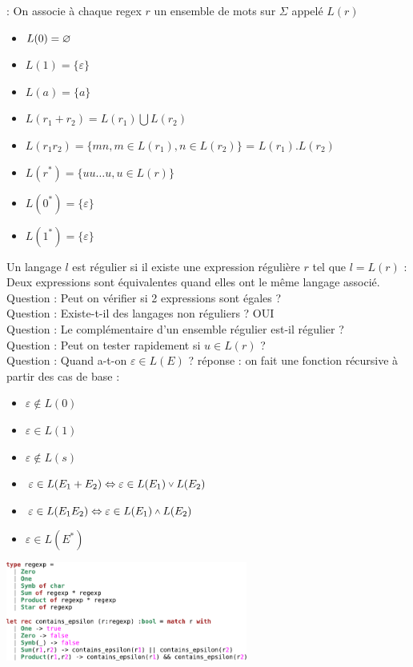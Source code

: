  : On associe à chaque regex $r$ un ensemble de mots sur $\Sigma$ appelé $L(r)$

\begin{itemize}
	\item $L(0) = \varnothing$
	\item $L(1) = \{ \varepsilon \}$
	\item $L(a) = \{ a \}$
	\item $L(r_1 + r_2) = L(r_1)\bigcup L(r_2)$
	\item $L(r_1r_2) = \{ mn, m \in L(r_1), n \in L(r_2) \}$ = $L(r_1) . L(r_2)$
	\item $L(r^*) = \{ uu \ldots u, u \in L(r) \}$
	\item $L(0^*) = \{ \varepsilon \}$
	\item $L(1^*) = \{ \varepsilon \}$
\end{itemize}

 Un langage $l$ est régulier si il existe une expression régulière $r$ tel que $l=L(r)$
 : Deux expressions sont équivalentes quand elles ont le même langage associé. \\
Question : Peut on vérifier si 2 expressions sont égales ? \\
Question : Existe-t-il des langages non réguliers ? OUI \\
Question : Le complémentaire d'un ensemble régulier est-il régulier ? \\
Question : Peut on tester rapidement si $u\in L(r)$ ? \\
Question : Quand a-t-on $\varepsilon \in L(E)$ ? réponse : on fait une fonction récursive à partir des cas de base : 
\begin{itemize}
	\item $\varepsilon \not\in L(0)$\\
	\item $\varepsilon \in L(1)$\\
	\item $\varepsilon \not\in L(s)$\\
	\item $\varepsilon \in L(E_1 + E_2) \Leftrightarrow \varepsilon \in L(E_1) \: \substack{\vee} \: L(E_2)$
	\item $\varepsilon \in L(E_1E_2) \Leftrightarrow \varepsilon \in L(E_1) \: \substack{\wedge} \: L(E_2)$
	\item $\varepsilon \in L(E^*)$
\end{itemize}

\includegraphics[width=300px]{Images/fig1.pdf}

